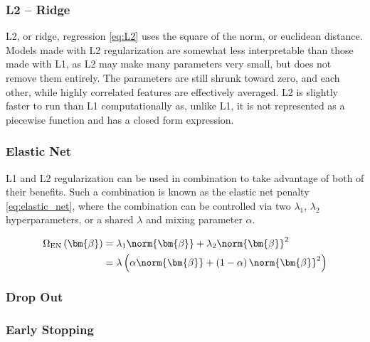 \subsubsection{L2 -- Ridge}
\label{ml:general:reg:L2}
L2, or ridge, regression \cref{eq:L2} uses the square of the norm, or euclidean distance.
Models made with L2 regularization are somewhat less interpretable than those made with L1,
as L2 may make many parameters very small, but does not remove them entirely.
The parameters are still shrunk toward zero, and each other,
while highly correlated features are effectively averaged.
L2 is slightly faster to run than L1 computationally as, unlike L1, it
is not represented as a piecewise function and has a closed form expression.

\subsubsection{Elastic Net}
\label{ml:general:reg:EN}

L1 and L2 regularization can be used in combination
to take advantage of both of their benefits.
Such a combination is known as the elastic net penalty \cref{eq:elastic_net},
where the combination can be controlled via two $\lambda_{1}$, $\lambda_{2}$ hyperparameters,
or a shared $\lambda$ and mixing parameter $\alpha$.

\begin{equation} \label{eq:elastic_net}
\begin{split}
\Omega_{\text{EN}}\left(\bm{\beta}\right) &= \lambda_{1} \norm{\bm{\beta}} + \lambda_{2} \norm{\bm{\beta}}^{2}\\
&= \lambda \left( \alpha\norm{\bm{\beta}} + \left(1-\alpha\right)\norm{\bm{\beta}}^{2} \right)
\end{split}
\end{equation}


\subsubsection{Drop Out}
\label{ml:general:reg:Drop}

\subsubsection{Early Stopping}
\label{ml:general:reg:early_stopping}
